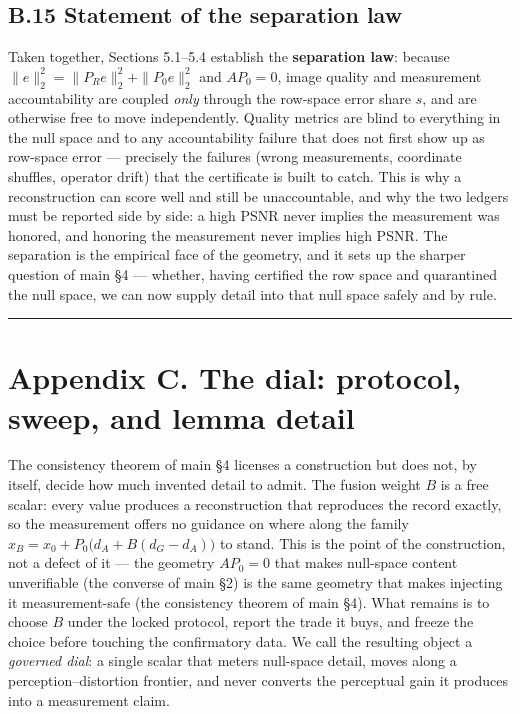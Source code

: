 \documentclass[11pt]{article}
\begin{document}
\subsection*{B.15 Statement of the separation law}

Taken together, Sections 5.1--5.4 establish the \textbf{separation law}: because $\|e\|_2^2 = \|P_R e\|_2^2 + \|P_0 e\|_2^2$ and $A P_0 = 0$, image quality and measurement accountability are coupled \textit{only} through the row-space error share $s$, and are otherwise free to move independently. Quality metrics are blind to everything in the null space and to any accountability failure that does not first show up as row-space error --- precisely the failures (wrong measurements, coordinate shuffles, operator drift) that the certificate is built to catch. This is why a reconstruction can score well and still be unaccountable, and why the two ledgers must be reported side by side: a high PSNR never implies the measurement was honored, and honoring the measurement never implies high PSNR. The separation is the empirical face of the geometry, and it sets up the sharper question of main §4 --- whether, having certified the row space and quarantined the null space, we can now supply detail into that null space safely and by rule.

\medskip\hrule\medskip

\section*{Appendix C. The dial: protocol, sweep, and lemma detail}


The consistency theorem of main §4 licenses a construction but does not, by itself, decide how much invented detail to admit. The fusion weight $B$ is a free scalar: every value produces a reconstruction that reproduces the record exactly, so the measurement offers no guidance on where along the family $\hat{x}_B = x_0 + P_0\big(d_A + B(d_G - d_A)\big)$ to stand. This is the point of the construction, not a defect of it --- the geometry $A P_0 = 0$ that makes null-space content unverifiable (the converse of main §2) is the same geometry that makes injecting it measurement-safe (the consistency theorem of main §4). What remains is to choose $B$ under the locked protocol, report the trade it buys, and freeze the choice before touching the confirmatory data. We call the resulting object a \textit{governed dial}: a single scalar that meters null-space detail, moves along a perception--distortion frontier, and never converts the perceptual gain it produces into a measurement claim.
\end{document}
